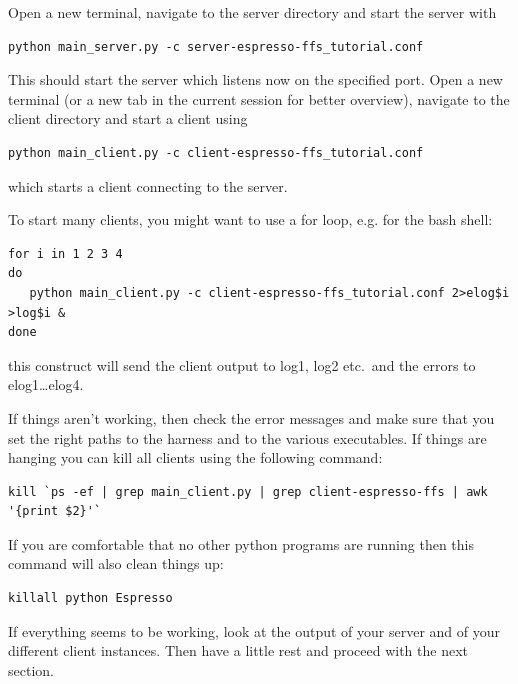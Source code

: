 \documentclass[a4paper,oneside]{article}
\newenvironment{mylisting}
{\begin{list}{}{\setlength{\leftmargin}{1em}}\item\scriptsize\bfseries}
{\end{list}}
\begin{document}
Open a new terminal, navigate to the server directory and start the server with
\begin{mylisting}
\begin{verbatim}
python main_server.py -c server-espresso-ffs_tutorial.conf
\end{verbatim}
\end{mylisting}
This should start the server which listens now on the specified port. Open a new terminal (or a new tab in the current session for better overview), navigate to the client directory and start a client using
\begin{mylisting}
\begin{verbatim}
python main_client.py -c client-espresso-ffs_tutorial.conf
\end{verbatim}
\end{mylisting}
which starts a client connecting to the server.

To start many clients, you might want to use a for loop, e.g. for the bash shell:
\begin{mylisting}
\begin{verbatim}
for i in 1 2 3 4
do
   python main_client.py -c client-espresso-ffs_tutorial.conf 2>elog$i >log$i &
done
\end{verbatim}
\end{mylisting}

this construct will send the client output to log1, log2 etc.~and the errors to elog1\ldots elog4.



If things aren't working, then check the error messages and make sure that you set the right paths to the harness and to the various executables.  If things are hanging you can kill all clients using the following command:
\begin{mylisting}
\begin{verbatim}
kill `ps -ef | grep main_client.py | grep client-espresso-ffs | awk '{print $2}'`
\end{verbatim}
\end{mylisting}

If you are comfortable that no other python programs are running then this command will also clean things up:
\begin{mylisting}
\begin{verbatim}
killall python Espresso
\end{verbatim}
\end{mylisting}

If everything seems to be working, look at the output of your server and of your different client instances. Then have a little rest and proceed with the next section.
\end{document}

